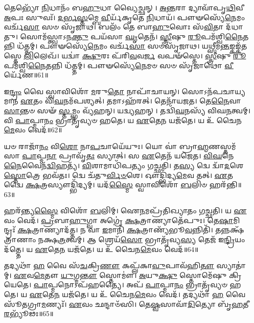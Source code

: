 𑌤𑍇𑌭𑍍𑌯𑍋᳴ \ul{𑌨𑌿}\-𑌧𑌾𑌨𑌂᳴ 𑌬\-\ul{𑌹𑍁}\-𑌧𑌾 𑌵𑍍𑌯𑍈𑌚𑍍𑌛𑌨𑍍।
\-\ul{𑌅}\-\-\ul{𑌨𑍍𑌤}\-𑌰𑌾 𑌦𑍍𑌯𑌾𑌵𑌾᳴𑌪𑍃\-\ul{𑌥𑌿}\-𑌵𑍀 \ul{𑌅}\-𑌪𑌃 𑌸𑍁𑌵𑌃᳴।
\-\ul{𑌦}\-\-\ul{𑌰𑍍𑌭}\-\-\ul{𑌸𑍍𑌤}\-𑌮𑍍𑌬𑍇 \ul{𑌵𑍀}\-𑌰𑍍𑌯᳴𑌕𑍃𑌤𑍇 \ul{𑌨𑌿}\-𑌧𑌾𑌯᳴।
𑌪𑍗𑍟𑌸𑍍𑌯𑍇᳴\-\ul{𑌨𑍇}\-𑌮𑌂 𑌵𑌰𑍍𑌚᳴\-\ul{𑌸𑌾} 𑌸𑍞 𑌸𑍃᳴𑌜𑌾𑌥।
𑌬𑌲𑌂᳴ 𑌤𑍇 𑌬𑌾\-\ul{𑌹𑍁}\-𑌵𑍋𑌃 𑌸᳴\-\ul{𑌵𑌿}\-𑌤𑌾 𑌦᳴𑌧𑌾𑌤𑍁।
𑌸𑍋𑌮᳴𑌸𑍍𑌤𑍍𑌵𑌾\-𑌽𑌨\-\ul{𑌕𑍍𑌤𑍁} 𑌪𑌯᳴𑌸𑌾 \ul{𑌘𑍃}\-𑌤𑍇𑌨᳴।
\-\ul{𑌸𑍍𑌤𑍍𑌰𑍀}\-𑌷𑍁 \ul{𑌰𑍂}\-𑌪𑌮᳴𑌶𑍍𑌵𑌿\-\ul{𑌨𑍈}\-𑌤𑌨𑍍𑌨𑌿 𑌧᳴𑌤𑍍𑌤𑌮𑍍।
𑌪𑍗𑍟𑌸𑍍𑌯𑍇᳴\-\ul{𑌨𑍇}\-𑌮𑌂 𑌵𑌰𑍍𑌚᳴\-\ul{𑌸𑌾} 𑌸𑍞𑌸𑍃᳴𑌜𑌾𑌥।
𑌯\-\ul{𑌥𑍍𑌸𑍀}\-𑌮\-\ul{𑌨𑍍𑌤}\-𑌙𑍍𑌕𑌙𑍍𑌕᳴𑌤𑌸𑍍𑌤𑍇 \ul{𑌲𑌿}\-𑌲𑍇𑌖᳴।
𑌯𑌦𑍍𑌵𑌾॑ \ul{𑌕𑍍𑌷𑍁}\-𑌰𑌃 𑌪᳴𑌰𑌿\-\ul{𑌵}\-𑌵\-\ul{𑌰𑍍𑌜} 𑌵𑌪𑍟᳴𑌸𑍍𑌤𑍇।
\-\ul{𑌸𑍍𑌤𑍍𑌰𑍀}\-𑌷𑍁 \ul{𑌰𑍂}\-𑌪𑌮᳴𑌶𑍍𑌵𑌿\-\ul{𑌨𑍈}\-𑌤𑌨𑍍𑌨𑌿 𑌧᳴𑌤𑍍𑌤𑌮𑍍।
𑌪𑍗𑍟𑌸𑍍𑌯𑍇᳴\-\ul{𑌨𑍇}\-𑌮𑍞 𑌸𑍞 𑌸𑍃᳴𑌜𑌾𑌥𑍋 \ul{𑌵𑍀}\-𑌰𑍍𑌯𑍇᳴𑌣॥61॥\anuvakamend[𑌅𑌵𑌾॑𑌸𑍍𑌰𑌾\-\ul{𑌗𑍍𑌦𑍀}\-𑌕𑍍𑌷𑌾 \ul{𑌵}\-𑌶𑌿\-\ul{𑌨𑍀} 𑌹𑍍𑌯𑍁᳴𑌗𑍍𑌰𑌾\-𑌽𑌦᳴𑌧𑌾\-\ul{𑌦𑍍𑌵}\-𑌵\-\ul{𑌰𑍍𑌜} 𑌵𑌪𑍟᳴ \ul{𑌸𑍍𑌤𑍇} 𑌦𑍍𑌵𑍇 𑌚᳴]

𑌇\-\ul{𑌨𑍍𑌦𑍍𑌰𑌂} 𑌵𑍈 𑌸𑍍𑌵𑌾𑌵𑌿𑌶𑍋᳴ \ul{𑌮}\-𑌰𑍁\-\ul{𑌤𑍋} 𑌨𑌾𑌪𑌾᳴𑌚𑌾𑌯𑌨𑍍।
𑌸𑍋𑌽𑌨᳴𑌪𑌚𑌾𑌯𑍍𑌯𑌮𑌾𑌨 \ul{𑌏}\-𑌤𑌂 𑌵𑌿᳴\-\ul{𑌘}\-𑌨𑌮᳴𑌪𑌶𑍍𑌯𑌤𑍍।
𑌤𑌮𑌾𑌽𑌹᳴𑌰𑌤𑍍।
𑌤𑍇𑌨𑌾᳴𑌯𑌜𑌤।
𑌤𑍇\-\ul{𑌨𑍈}\-𑌵𑌾\-\ul{𑌸𑌾}\-𑌨𑍍𑌤𑍞 𑌸𑍟᳴ \ul{𑌸𑍍𑌤}\-𑌮𑍍𑌭𑌂 𑌵𑍍𑌯᳴𑌹𑌨𑍍।
𑌯𑌦𑍍𑌵𑍍𑌯𑌹𑌨𑍍।
𑌤𑌦𑍍𑌵𑌿᳴\-\ul{𑌘}\-𑌨𑌸𑍍𑌯᳴ 𑌵𑌿𑌘\-\ul{𑌨}\-𑌤𑍍𑌵𑌮𑍍।
𑌵𑌿 \ul{𑌪𑌾}\-𑌪𑍍𑌮𑌾\-\ul{𑌨𑌂} 𑌭𑍍𑌰𑌾𑌤𑍃᳴𑌵𑍍𑌯𑍞 𑌹𑌤𑍇।
𑌯 \ul{𑌏}\-𑌤𑍇\-\ul{𑌨} 𑌯𑌜᳴𑌤𑍇।
𑌯 𑌉᳴ 𑌚𑍈𑌨\-\ul{𑌮𑍇}\-𑌵𑌂 𑌵𑍇𑌦᳴॥62॥

𑌯𑍞 𑌰𑌾𑌜𑌾᳴\-\ul{𑌨𑌂} 𑌵𑌿\-\ul{𑌶𑍋} 𑌨𑌾\-\ul{𑌪}\-𑌚𑌾𑌯𑍇᳴𑌯𑍁𑌃।
𑌯𑍋 𑌵𑌾॑ 𑌬𑍍𑌰𑌾\-\ul{𑌹𑍍𑌮}\-𑌣𑌸𑍍𑌤𑌮᳴𑌸𑌾 \ul{𑌪𑌾}\-𑌪𑍍𑌮\-\ul{𑌨𑌾} 𑌪𑍍𑌰𑌾𑌵𑍃᳴\-\ul{𑌤𑌃} 𑌸𑍍𑌯𑌾𑌤𑍍।
𑌸 \ul{𑌏}\-𑌤𑍇𑌨᳴ 𑌯𑌜𑍇𑌤।
\-\ul{𑌵𑌿}\-\-\ul{𑌘}\-𑌨𑍇\-\ul{𑌨𑍈}\-𑌵𑍈𑌨᳴\-\ul{𑌦𑍍𑌵𑌿}\-𑌹𑌤𑍍𑌯᳴।
\-\ul{𑌵𑌿}\-𑌶𑌾𑌮𑌾𑌧𑌿᳴𑌪𑌤𑍍𑌯𑌂 𑌗𑌚𑍍𑌛𑌤𑌿।
𑌤\-\ul{𑌸𑍍𑌯} 𑌦𑍍𑌵𑍇 𑌦𑍍𑌵𑌾᳴\-\ul{𑌦}\-𑌶𑍇 \ul{𑌸𑍍𑌤𑍋}\-𑌤𑍍𑌰𑍇 𑌭𑌵᳴𑌤𑌃।
𑌦𑍍𑌵𑍇 𑌚᳴𑌤𑍁\-\ul{𑌰𑍍𑌵𑌿}\-\-\ul{𑍞}\-𑌶𑍇।
𑌔𑌦𑍍𑌭𑌿᳴𑌦𑍍𑌯\-\ul{𑌮𑍇}\-𑌵 𑌤𑌤𑍍।
\-\ul{𑌏}\-𑌤𑌦𑍍𑌵𑍈 \ul{𑌕𑍍𑌷}\-𑌤𑍍𑌰𑌸𑍍𑌯𑍗𑌦𑍍𑌭𑌿᳴𑌦𑍍𑌯𑌮𑍍।
𑌯𑌦᳴\-\ul{𑌸𑍍𑌮𑍈} 𑌸𑍍𑌵𑌾𑌵𑌿𑌶𑍋᳴ \ul{𑌬}\-𑌲𑌿𑍞 𑌹𑌰᳴𑌨𑍍𑌤𑌿॥63॥

𑌹𑌰᳴𑌨𑍍𑌤𑍍𑌯\-\ul{𑌸𑍍𑌮𑍈} 𑌵𑌿𑌶𑍋᳴ \ul{𑌬}\-𑌲𑌿𑌮𑍍।
𑌐\-\ul{𑌨}\-𑌮𑌪𑍍𑌰᳴𑌤𑌿𑌖𑍍𑌯𑌾𑌤𑌂 𑌗𑌚𑍍𑌛𑌤𑌿।
𑌯 \ul{𑌏}\-𑌵𑌂 𑌵𑍇𑌦᳴।
\-\ul{𑌪𑍍𑌰}\-𑌬𑌾\-\ul{𑌹𑍁}\-𑌗𑍍𑌵𑌾 𑌅𑌗𑍍𑌰𑍇॑ \ul{𑌕𑍍𑌷}\-𑌤𑍍𑌰𑌾𑌣𑍍𑌯𑌾𑌤𑍇᳴𑌪𑍁𑌃।
𑌤𑍇\-\ul{𑌷𑌾}\-𑌮𑌿𑌨𑍍𑌦𑍍𑌰𑌃᳴ \ul{𑌕𑍍𑌷}\-𑌤𑍍𑌰𑌾𑌣𑍍𑌯𑌾𑌦᳴𑌤𑍍𑌤।
𑌨 𑌵𑌾 \ul{𑌇}\-𑌮𑌾𑌨𑌿᳴ \ul{𑌕𑍍𑌷}\-𑌤𑍍𑌰𑌾𑌣𑍍𑌯᳴𑌭𑍂\-\ul{𑌵}\-𑌨𑍍𑌨𑌿𑌤𑌿᳴।
𑌤𑌨𑍍𑌨𑌕𑍍𑌷᳴𑌤𑍍𑌰𑌾𑌣𑌾𑌂 𑌨𑌕𑍍𑌷\-\ul{𑌤𑍍𑌰}\-𑌤𑍍𑌵𑌮𑍍।
𑌆 𑌶𑍍𑌰𑍇𑌯᳴\-\ul{𑌸𑍋} 𑌭𑍍𑌰𑌾𑌤𑍃᳴𑌵𑍍𑌯\-\ul{𑌸𑍍𑌯} 𑌤𑍇𑌜᳴ 𑌇\-\ul{𑌨𑍍𑌦𑍍𑌰𑌿}\-𑌯𑌂 𑌦᳴𑌤𑍍𑌤𑍇।
𑌯 \ul{𑌏}\-𑌤𑍇\-\ul{𑌨} 𑌯𑌜᳴𑌤𑍇।
𑌯 𑌉᳴ 𑌚𑍈𑌨\-\ul{𑌮𑍇}\-𑌵𑌂 𑌵𑍇𑌦᳴॥64॥

𑌤𑌦𑍍𑌯𑌥𑌾᳴ \ul{𑌹} 𑌵𑍈 𑌸᳴\-\ul{𑌚}\-𑌕𑍍𑌰𑌿\-\ul{𑌣𑍗} 𑌕𑌪𑍍𑌲᳴𑌕𑌾\-\ul{𑌵𑍁}\-𑌪𑌾𑌵᳴𑌹𑌿\-\ul{𑌤𑍗} 𑌸𑍍𑌯𑌾𑌤𑌾॑𑌮𑍍।
\-\ul{𑌏}\-𑌵\-\ul{𑌮𑍇}\-𑌤𑍗 \ul{𑌯𑍁}\-𑌗𑍍𑌮\-\ul{𑌨𑍍𑌤𑍗} 𑌸𑍍𑌤𑍋𑌮𑍗॑।
\-\ul{𑌅}\-𑌯𑍁\-\ul{𑌕𑍍𑌷𑍁} 𑌸𑍍𑌤𑍋𑌮𑍇᳴𑌷𑍁 𑌕𑍍𑌰𑌿𑌯𑍇𑌤𑍇।
\-\ul{𑌪𑌾}\-𑌪𑍍𑌮𑌨𑍋\-𑌽𑌪᳴𑌹𑌤𑍍𑌯𑍈।
𑌅𑌪᳴ \ul{𑌪𑌾}\-𑌪𑍍𑌮𑌾\-\ul{𑌨𑌂} 𑌭𑍍𑌰𑌾𑌤𑍃᳴𑌵𑍍𑌯𑍞 𑌹𑌤𑍇।
𑌯 \ul{𑌏}\-𑌤𑍇\-\ul{𑌨} 𑌯𑌜᳴𑌤𑍇।
𑌯 𑌉᳴ 𑌚𑍈𑌨\-\ul{𑌮𑍇}\-𑌵𑌂 𑌵𑍇𑌦᳴।
𑌤𑌦𑍍𑌯𑌥𑌾᳴ \ul{𑌹} 𑌵𑍈 𑌸𑍂᳴𑌤𑌗𑍍𑌰𑌾\-\ul{𑌮}\-𑌣𑍍𑌯𑌃᳴।
\-\ul{𑌏}\-𑌵𑌂 𑌛𑌨𑍍𑌦𑌾𑍞᳴𑌸𑌿।
𑌤𑍇\-\ul{𑌷𑍍𑌵}\-𑌸𑌾𑌵𑌾᳴\-\ul{𑌦𑌿}\-𑌤𑍍𑌯𑍋 𑌬𑍃᳴\-\ul{𑌹}\-𑌤𑍀\-\ul{𑌰}\-𑌭𑍍𑌯𑍂᳴𑌢𑌃॥65॥

